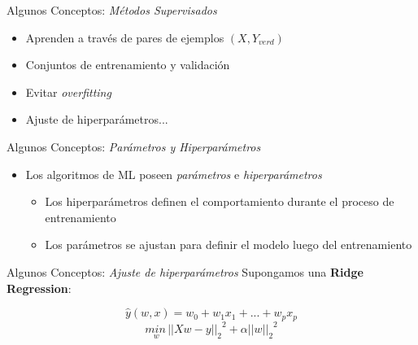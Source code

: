 \documentclass[10pt]{beamer}
\begin{document}
\begin{frame}{Algunos Conceptos: \textit{Métodos Supervisados}}
\begin{itemize}
  \item Aprenden a través de pares de ejemplos $(X, Y_{verd})$
  \item Conjuntos de entrenamiento y validación
  \item Evitar \textit{overfitting}
  \item Ajuste de hiperparámetros...
\end{itemize}
\end{frame}

\begin{frame}{Algunos Conceptos: \textit{Parámetros y Hiperparámetros}}
  \begin{itemize}
    \item Los algoritmos de ML poseen \textit{parámetros} e \textit{hiperparámetros}
    \begin{itemize}
      \item Los hiperparámetros definen el comportamiento durante el proceso de entrenamiento
      \item Los parámetros se ajustan para definir el modelo luego del entrenamiento
    \end{itemize}
    \pause

  \end{itemize}
\end{frame}


\begin{frame}{Algunos Conceptos: \textit{Ajuste de hiperparámetros}}
  Supongamos una \textbf{Ridge Regression}:
  \begin{center}
    $$\hat{y}(w, x) = w_0 + w_1 x_1 + ... + w_p x_p$$
    $$\underset{w}{min\,}{{||X w - y||_2}}^2 + \alpha{||w||_2}^2$$
  \end{center}
\end{frame}



\end{document}
